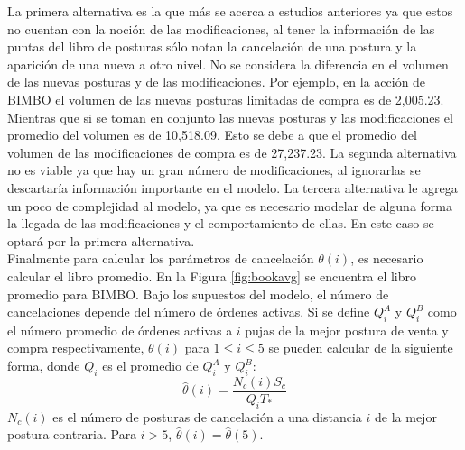\documentclass[11pt]{article}
\numberwithin{equation}{section} %
\begin{document}
La primera alternativa es la que más se acerca a estudios anteriores ya que estos no cuentan con la noción de las modificaciones, al tener la información de las puntas del libro de posturas sólo notan la cancelación de una postura y la aparición de una nueva a otro nivel. No se considera la diferencia en el volumen de las nuevas posturas y de las modificaciones. Por ejemplo, en la acción de BIMBO el volumen de las nuevas posturas limitadas de compra es de 2,005.23. Mientras que si se toman en conjunto las nuevas posturas y las modificaciones el promedio del volumen es de 10,518.09. Esto se debe a que el promedio del volumen de las modificaciones de compra es de 27,237.23. La segunda alternativa no es viable ya que hay un gran número de modificaciones, al ignorarlas se descartaría información importante en el modelo. La tercera alternativa le agrega un poco de complejidad al modelo, ya que es necesario modelar de alguna forma la llegada de las modificaciones y el comportamiento de ellas. En este caso se optará por la primera alternativa.\\

Finalmente para calcular los parámetros de cancelación $\theta(i)$, es necesario calcular el libro promedio. En la Figura \ref{fig:bookavg} se encuentra el libro promedio para BIMBO. Bajo los supuestos del modelo, el número de cancelaciones depende del número de órdenes activas. Si se define $Q_i^A$ y $Q_i^B$ como el número promedio de órdenes activas a $i$ pujas de la mejor postura de venta y compra respectivamente,  $\theta(i)$ para $1\leq i \leq 5$ se pueden calcular de la siguiente forma, donde $Q_i$ es el promedio de $Q_i^A$ y $Q_i^B$:
\[
\hat{\theta}(i)=\frac{N_c(i) S_c}{Q_i T_*}
\]
$N_c(i)$ es el número de posturas de cancelación a una distancia $i$ de la mejor postura contraria. Para $i>5$, $\hat{\theta}(i)=\hat{\theta}(5)$.
\end{document}

